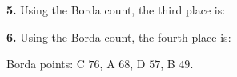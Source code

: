 \documentclass[12pt]{ximera}
\begin{document}
\begin{problem}
\begin{prompt}
\textbf{5.} Using the Borda count, the third place is:
\begin{multipleChoice}
\end{multipleChoice}
\end{prompt}

\begin{prompt}
\textbf{6.} Using the Borda count, the fourth place is:
\begin{multipleChoice}
\end{multipleChoice}
\begin{feedback}
Borda points: C $76$, A $68$, D $57$, B $49$.
\end{feedback}
\end{prompt}
\end{problem}
\end{document}
